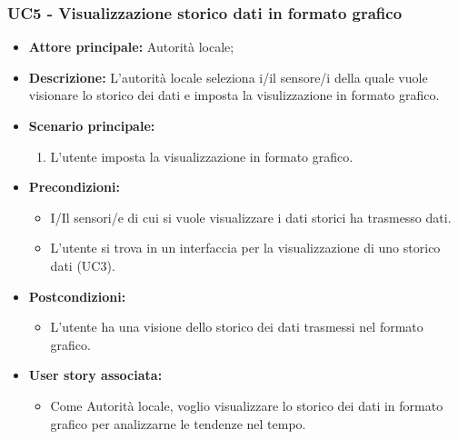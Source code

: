 \subsubsection{UC5 - Visualizzazione storico dati in formato grafico}
\begin{itemize}
    \item \textbf{Attore principale:} Autorità locale;
    \item \textbf{Descrizione:} L’autorità locale seleziona i/il sensore/i della quale vuole visionare lo storico dei dati e imposta la visulizzazione in formato grafico.
    \item \textbf{Scenario principale:}
          \begin{enumerate}
              \item L'utente imposta la visualizzazione in formato grafico.
          \end{enumerate}
    \item \textbf{Precondizioni:}
          \begin{itemize}
              \item  I/Il sensori/e di cui si vuole visualizzare i dati storici ha trasmesso dati.
              \item  L'utente si trova in un interfaccia per la visualizzazione di uno storico dati (UC3).
          \end{itemize}
    \item \textbf{Postcondizioni:}
          \begin{itemize}
              \item  L'utente ha una visione dello storico dei dati trasmessi nel formato grafico.
          \end{itemize}
    \item \textbf{User story associata:}
          \begin{itemize}
              \item Come Autorità locale, voglio visualizzare lo storico dei dati in formato grafico per analizzarne le tendenze nel tempo.
          \end{itemize}
\end{itemize}